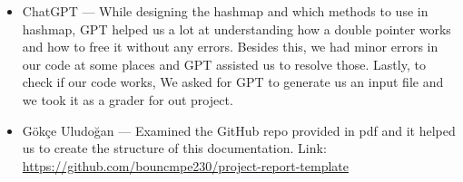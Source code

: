\documentclass[a4paper,12pt]{article}
\begin{document}


\begin{itemize}
    \item ChatGPT --- While designing the hashmap and which methods to use in hashmap, GPT helped us a lot at understanding how a double pointer works and how to free it without any errors. Besides this, we had minor errors in our code at some places and GPT assisted us to resolve those. Lastly, to check if our code works, We asked for GPT to generate us an input file and we took it as a grader for out project.
    \item Gökçe Uludoğan --- Examined the GitHub repo provided in pdf and it helped us to create the structure of this documentation.\newline\newline
    Link: \url{https://github.com/bouncmpe230/project-report-template}
\end{itemize}
\end{document}
